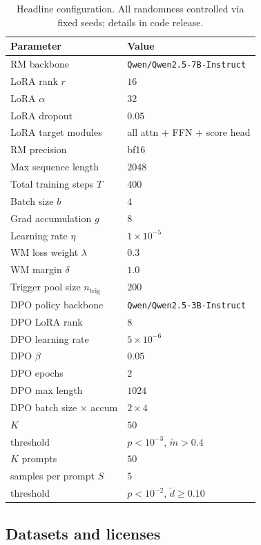 \begin{table}[t]
\centering
\small
\begin{tabular}{ll}
\toprule
Parameter & Value \\
\midrule
RM backbone & \texttt{Qwen/Qwen2.5-7B-Instruct} \\
LoRA rank $r$ & $16$ \\
LoRA $\alpha$ & $32$ \\
LoRA dropout & $0.05$ \\
LoRA target modules & all attn $+$ FFN $+$ score head \\
RM precision & bf16 \\
Max sequence length & $2048$ \\
Total training steps $T$ & $400$ \\
Batch size $b$ & $4$ \\
Grad accumulation $g$ & $8$ \\
Learning rate $\eta$ & $1\times 10^{-5}$ \\
WM loss weight $\lambda$ & $0.3$ \\
WM margin $\delta$ & $1.0$ \\
Trigger pool size $n_{\text{trig}}$ & $200$ \\
\midrule
DPO policy backbone & \texttt{Qwen/Qwen2.5-3B-Instruct} \\
DPO LoRA rank & $8$ \\
DPO learning rate & $5\times 10^{-6}$ \\
DPO $\beta$ & $0.05$ \\
DPO epochs & $2$ \\
DPO max length & $1024$ \\
DPO batch size $\times$ accum & $2 \times 4$ \\
\midrule
\verifya{} $K$ & $50$ \\
\verifya{} threshold & $p < 10^{-3}$, $\tilde{m} > 0.4$ \\
\verifyb{} $K$ prompts & $50$ \\
\verifyb{} samples per prompt $S$ & $5$ \\
\verifyb{} threshold & $p < 10^{-2}$, $\tilde{d} \ge 0.10$ \\
\bottomrule
\end{tabular}
\caption{Headline configuration. All randomness controlled via
fixed seeds; details in code release.}
\label{tab:hyperparams}
\end{table}

\subsection{Datasets and licenses}

